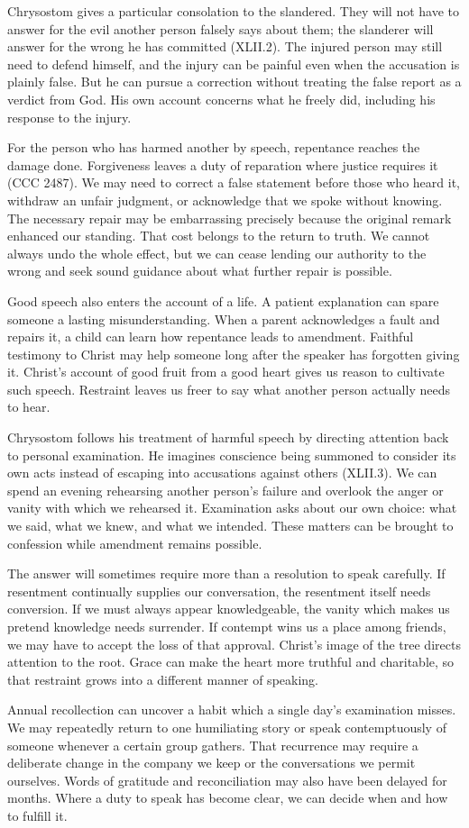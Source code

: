 Chrysostom gives a particular consolation to the slandered. They will not have to answer for the evil another person falsely says about them; the slanderer will answer for the wrong he has committed (XLII.2). The injured person may still need to defend himself, and the injury can be painful even when the accusation is plainly false. But he can pursue a correction without treating the false report as a verdict from God. His own account concerns what he freely did, including his response to the injury.

For the person who has harmed another by speech, repentance reaches the damage done. Forgiveness leaves a duty of reparation where justice requires it (CCC 2487). We may need to correct a false statement before those who heard it, withdraw an unfair judgment, or acknowledge that we spoke without knowing. The necessary repair may be embarrassing precisely because the original remark enhanced our standing. That cost belongs to the return to truth. We cannot always undo the whole effect, but we can cease lending our authority to the wrong and seek sound guidance about what further repair is possible.

Good speech also enters the account of a life. A patient explanation can spare someone a lasting misunderstanding. When a parent acknowledges a fault and repairs it, a child can learn how repentance leads to amendment. Faithful testimony to Christ may help someone long after the speaker has forgotten giving it. Christ's account of good fruit from a good heart gives us reason to cultivate such speech. Restraint leaves us freer to say what another person actually needs to hear.

Chrysostom follows his treatment of harmful speech by directing attention back to personal examination. He imagines conscience being summoned to consider its own acts instead of escaping into accusations against others (XLII.3). We can spend an evening rehearsing another person's failure and overlook the anger or vanity with which we rehearsed it. Examination asks about our own choice: what we said, what we knew, and what we intended. These matters can be brought to confession while amendment remains possible.

The answer will sometimes require more than a resolution to speak carefully. If resentment continually supplies our conversation, the resentment itself needs conversion. If we must always appear knowledgeable, the vanity which makes us pretend knowledge needs surrender. If contempt wins us a place among friends, we may have to accept the loss of that approval. Christ's image of the tree directs attention to the root. Grace can make the heart more truthful and charitable, so that restraint grows into a different manner of speaking.

Annual recollection can uncover a habit which a single day's examination misses. We may repeatedly return to one humiliating story or speak contemptuously of someone whenever a certain group gathers. That recurrence may require a deliberate change in the company we keep or the conversations we permit ourselves. Words of gratitude and reconciliation may also have been delayed for months. Where a duty to speak has become clear, we can decide when and how to fulfill it.

